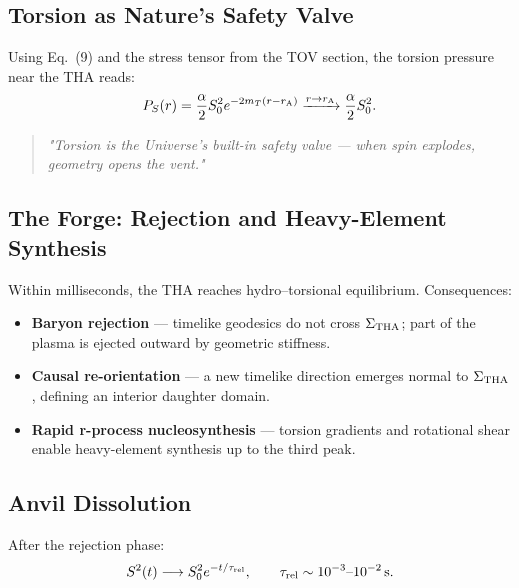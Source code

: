 \documentclass{article}
\begin{document}
\subsection{Torsion as Nature's Safety Valve}
\label{subsec:THF-valve}

Using Eq.~(9) and the stress tensor from the TOV section, the torsion pressure near the THA reads:
\begin{equation}
  P_{S}(r) = \frac{\alpha}{2} S_{0}^{2} e^{-2m_{T}(r - r_{\rm A})} \xrightarrow{r \to r_{\rm A}} \frac{\alpha}{2} S_{0}^{2}.
\end{equation}

\begin{quotation}
\centering
\textit{"Torsion is the Universe's built-in safety valve --- when spin explodes, geometry opens the vent."}
\end{quotation}

\subsection{The Forge: Rejection and Heavy-Element Synthesis}
\label{subsec:THF-forge}

Within milliseconds, the THA reaches hydro--torsional equilibrium. Consequences:

\begin{itemize}[leftmargin=*]
  \item \textbf{Baryon rejection} --- timelike geodesics do not cross $\Sigma_{\rm THA}$; part of the plasma is ejected outward by geometric stiffness.
  \item \textbf{Causal re-orientation} --- a new timelike direction emerges normal to $\Sigma_{\rm THA}$, defining an interior daughter domain.
  \item \textbf{Rapid r-process nucleosynthesis} --- torsion gradients and rotational shear enable heavy-element synthesis up to the third peak.
\end{itemize}

\subsection{Anvil Dissolution}
\label{subsec:THF-dissolution}

After the rejection phase:
\begin{equation}
  S^{2}(t) \longrightarrow S_{0}^{2} e^{-t/\tau_{\rm rel}}, \qquad \tau_{\rm rel} \sim 10^{-3}\text{--}10^{-2}\,\mathrm{s}.
\end{equation}
\end{document}
